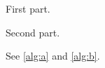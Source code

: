\documentclass{article}
\begin{document}
\begin{algorithm}[H]
\caption{Factorization}\label{alg:a}
First part.
\end{algorithm}
\begin{algorithm}[H]
\ContinuedFloat
\caption{Factorization (continued)}\label{alg:b}
Second part.
\end{algorithm}
See \ref{alg:a} and \ref{alg:b}.
\end{document}
